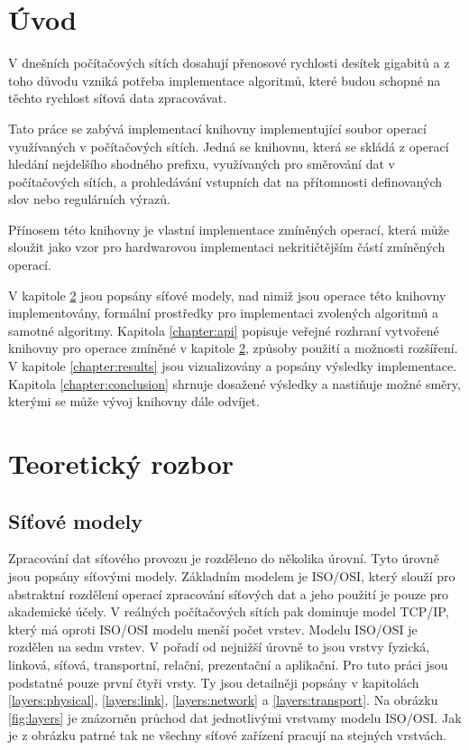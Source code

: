 
\chapter{Úvod}
V dnešních počítačových sítích dosahují přenosové rychlosti desítek gigabitů a z toho důvodu vzniká
potřeba implementace algoritmů, které budou schopné na těchto rychlost síťová data zpracovávat.

Tato práce se zabývá implementací knihovny implementující soubor operací využívaných v počítačových sítích.
Jedná se knihovnu, která se skládá z operací hledání nejdelšího shodného prefixu,
využívaných pro směrování dat v počítačových sítích, a prohledávání vstupních dat na přítomnosti
definovaných slov nebo regulárních výrazů.

Přínosem této knihovny je vlastní implementace zmíněných operací, která může sloužit jako vzor
pro hardwarovou implementaci nekritičtějším částí zmíněných operací.

V kapitole \ref{chapter:theoretical} jsou popsány síťové modely, nad nimiž jsou operace této knihovny implementovány,
formální prostředky pro implementaci zvolených algoritmů a samotné algoritmy. Kapitola \ref{chapter:api} popisuje
veřejné rozhraní vytvořené knihovny pro operace zmíněné v kapitole \ref{chapter:theoretical},
způsoby použití a možnosti rozšíření. V kapitole \ref{chapter:results} jsou vizualizovány a popsány
výsledky implementace. Kapitola \ref{chapter:conclusion} shrnuje dosažené výsledky a nastiňuje možné směry,
kterými se může vývoj knihovny dále odvíjet.


\chapter{Teoretický rozbor}\label{chapter:theoretical}

\section{Síťové modely}

Zpracování dat síťového provozu je rozděleno do několika úrovní. Tyto úrovně jsou popsány síťovými modely.
Základním modelem je ISO/OSI, který slouží pro abstraktní rozdělení operací zpracování síťových dat a jeho použití je
pouze pro akademické účely. V reálných počítačových sítích pak dominuje model TCP/IP, který má oproti
ISO/OSI modelu menší počet vrstev. Modelu ISO/OSI je rozdělen na sedm vrstev. V pořadí od nejnižší úrovně to
jsou vrstvy fyzická, linková, síťová, transportní, relační, prezentační a aplikační. Pro tuto práci jsou
podstatné pouze první čtyři vrsty. Ty jsou detailněji popsány v kapitolách \ref{layers:physical},
\ref{layers:link}, \ref{layers:network} a \ref{layers:transport}. Na obrázku \ref{fig:layers} je
znázorněn průchod dat jednotlivými vrstvamy modelu ISO/OSI. Jak je z obrázku patrné tak ne všechny síťové
zařízení pracují na stejných vrstvách.

